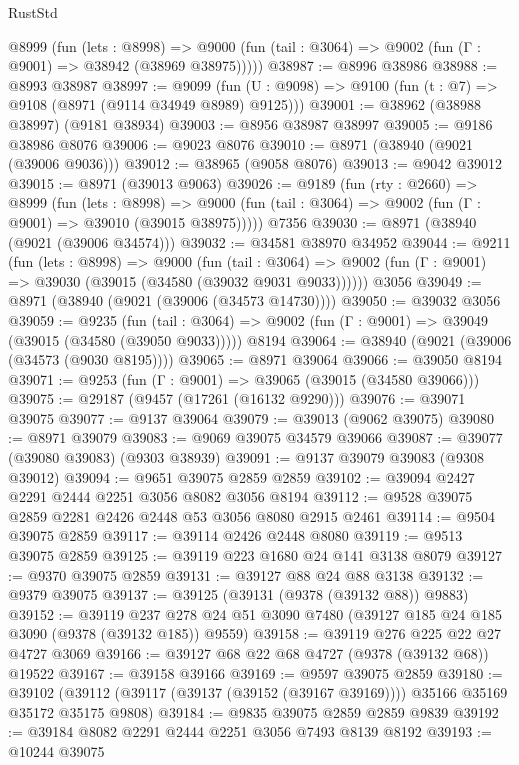 \begin{lexlean}{RustStd}
\begin{coremodule}
    @8999
      (fun (lets : @8998) =>
      @9000 (fun (tail : @3064) => @9002 (fun (Γ : @9001) => @38942 (@38969 @38975)))))
@38987 := @8996 @38986
@38988 := @8993 @38987
@38997 := @9099
    (fun (U : @9098) => @9100 (fun (t : @7) => @9108 (@8971 (@9114 @34949 @8989) @9125)))
@39001 := @38962 (@38988 @38997) (@9181 @38934)
@39003 := @8956 @38987 @38997
@39005 := @9186 @38986 @8076
@39006 := @9023 @8076
@39010 := @8971 (@38940 (@9021 (@39006 @9036)))
@39012 := @38965 (@9058 @8076)
@39013 := @9042 @39012
@39015 := @8971 (@39013 @9063)
@39026 := @9189
    (fun (rty : @2660) =>
    @8999
      (fun (lets : @8998) =>
      @9000 (fun (tail : @3064) => @9002 (fun (Γ : @9001) => @39010 (@39015 @38975)))))
    @7356
@39030 := @8971 (@38940 (@9021 (@39006 @34574)))
@39032 := @34581 @38970 @34952
@39044 := @9211
    (fun (lets : @8998) =>
    @9000
      (fun (tail : @3064) =>
      @9002 (fun (Γ : @9001) => @39030 (@39015 (@34580 (@39032 @9031 @9033))))))
    @3056
@39049 := @8971 (@38940 (@9021 (@39006 (@34573 @14730))))
@39050 := @39032 @3056
@39059 := @9235
    (fun (tail : @3064) => @9002 (fun (Γ : @9001) => @39049 (@39015 (@34580 (@39050 @9033)))))
    @8194
@39064 := @38940 (@9021 (@39006 (@34573 (@9030 @8195))))
@39065 := @8971 @39064
@39066 := @39050 @8194
@39071 := @9253 (fun (Γ : @9001) => @39065 (@39015 (@34580 @39066)))
@39075 := @29187 (@9457 (@17261 (@16132 @9290)))
@39076 := @39071 @39075
@39077 := @9137 @39064
@39079 := @39013 (@9062 @39075)
@39080 := @8971 @39079
@39083 := @9069 @39075 @34579 @39066
@39087 := @39077 (@39080 @39083) (@9303 @38939)
@39091 := @9137 @39079 @39083 (@9308 @39012)
@39094 := @9651 @39075 @2859 @2859
@39102 := @39094 @2427 @2291 @2444 @2251 @3056 @8082 @3056 @8194
@39112 := @9528 @39075 @2859 @2281 @2426 @2448 @53 @3056 @8080 @2915 @2461
@39114 := @9504 @39075 @2859
@39117 := @39114 @2426 @2448 @8080
@39119 := @9513 @39075 @2859
@39125 := @39119 @223 @1680 @24 @141 @3138 @8079
@39127 := @9370 @39075 @2859
@39131 := @39127 @88 @24 @88 @3138
@39132 := @9379 @39075
@39137 := @39125 (@39131 (@9378 (@39132 @88)) @9883)
@39152 := @39119
    @237
    @278
    @24
    @51
    @3090
    @7480
    (@39127 @185 @24 @185 @3090 (@9378 (@39132 @185)) @9559)
@39158 := @39119 @276 @225 @22 @27 @4727 @3069
@39166 := @39127 @68 @22 @68 @4727 (@9378 (@39132 @68)) @19522
@39167 := @39158 @39166
@39169 := @9597 @39075 @2859
@39180 := @39102
    (@39112 (@39117 (@39137 (@39152 (@39167 @39169)))) @35166 @35169 @35172 @35175 @9808)
@39184 := @9835 @39075 @2859 @2859 @9839
@39192 := @39184 @8082 @2291 @2444 @2251 @3056 @7493 @8139 @8192
@39193 := @10244 @39075

\end{coremodule}
\end{lexlean}
